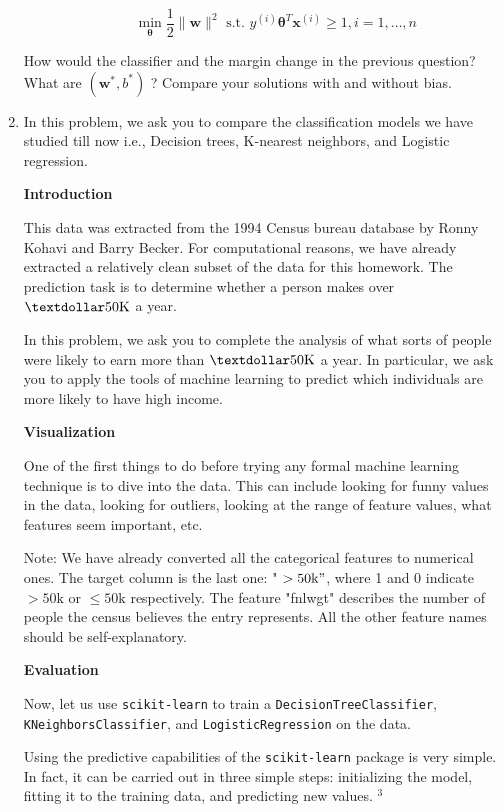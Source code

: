 \documentclass[letterpaper]{article}
\theoremstyle{definition}
\begin{document}
\begin{enumerate}
\begin{enumerate}
$$\min _{\boldsymbol{\theta}} \frac{1}{2}\|\mathbf{w}\|^{2}
      \text { s.t. } y^{(i)} \boldsymbol{\theta}^{T} \mathbf{x}^{(i)}
      \geq 1, i=1, \ldots, n$$
\end{enumerate}

How would the classifier and the margin change in the previous
question? What are \(\left(\mathbf{w}^{*}, b^{*}\right)\) ? Compare
your solutions with and without bias.

\item In this problem, we ask you to compare the classification models we
have studied till now i.e., Decision trees, K-nearest neighbors,
and Logistic regression.

\textbf{Introduction}

This data was extracted from the 1994 Census bureau database by
Ronny Kohavi and Barry Becker. For computational reasons, we have
already extracted a relatively clean subset of the data for this
homework. The prediction task is to determine whether a person
makes over \(\textdollar 50\mathrm{K}\) a year.

In this problem, we ask you to complete the analysis of what sorts
of people were likely to earn more than \(\textdollar 50\mathrm{K}\)
a year. In particular, we ask you to apply the tools of machine
learning to predict which individuals are more likely to have high
income.

\textbf{Visualization}

One of the first things to do before trying any formal machine
learning technique is to dive into the data. This can include
looking for funny values in the data, looking for outliers, looking
at the range of feature values, what features seem important, etc.

Note: We have already converted all the categorical features to
numerical ones. The target column is the last one: " \(>50
   \mathrm{k} "\), where 1 and 0 indicate \(>50 \mathrm{k}\) or \(\leq 50
   \mathrm{k}\) respectively. The feature "fnlwgt" describes the number
of people the census believes the entry represents. All the other
feature names should be self-explanatory.

\textbf{Evaluation}

Now, let us use \texttt{scikit-learn} to train a \texttt{DecisionTreeClassifier},
\texttt{KNeighborsClassifier}, and \texttt{LogisticRegression} on the data.

Using the predictive capabilities of the \texttt{scikit-learn} package is
very simple. In fact, it can be carried out in three simple steps:
initializing the model, fitting it to the training data, and
predicting new values. \({ }^{3}\)


\end{enumerate}
\end{document}
